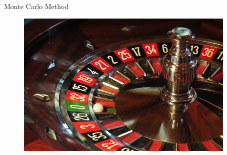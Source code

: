 \documentclass[compress,red,12pt]{beamer}
\begin{document}
\begin{frame}{Monte Carlo Method}
  \begin{figure}
    \centering
    \begin{overprint}
      {\centerline{\includegraphics[height=7cm]{images/roullete.jpg}}} %
      {\centerline{\def\svgwidth{0.9\linewidth}\small{}}}
      {\centerline{\def\svgwidth{0.9\linewidth}\small{}}}
      {\centerline{\def\svgwidth{0.9\linewidth}\small{}}}
      {\centerline{\def\svgwidth{0.9\linewidth}\small{}}}
      {\centerline{\def\svgwidth{0.9\linewidth}\small{}}}
      {\centerline{\def\svgwidth{0.9\linewidth}\small{}}}
      {\centerline{\def\svgwidth{0.9\linewidth}\small{}}}
      {\centerline{\def\svgwidth{0.9\linewidth}\small{}}}
      {\centerline{\def\svgwidth{0.9\linewidth}\small{}}}
    \end{overprint}
  \end{figure}
\end{frame}

\end{document}

